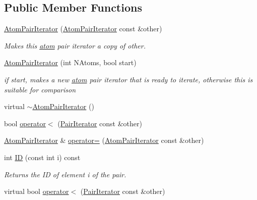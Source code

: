 \subsection*{Public Member Functions}
\begin{DoxyCompactItemize}
\item 
\hyperlink{classJKBuilder_1_1AtomPairIterator_a696744d82a9bb3feee21a96f450a510b}{AtomPairIterator} (\hyperlink{classJKBuilder_1_1AtomPairIterator}{AtomPairIterator} const \&other)
\begin{DoxyCompactList}\small\item\em Makes this \hyperlink{classJKBuilder_1_1atom}{atom} pair iterator a copy of other. \item\end{DoxyCompactList}\item 
\hyperlink{classJKBuilder_1_1AtomPairIterator_ad5df59ed812804b6371f17eabeb7d261}{AtomPairIterator} (int NAtoms, bool start)
\begin{DoxyCompactList}\small\item\em if start, makes a new \hyperlink{classJKBuilder_1_1atom}{atom} pair iterator that is ready to iterate, otherwise this is suitable for comparison \item\end{DoxyCompactList}\item 
virtual \hyperlink{classJKBuilder_1_1AtomPairIterator_aa26e88e305008d272c920bf0b959e96b}{$\sim$AtomPairIterator} ()
\item 
bool \hyperlink{classJKBuilder_1_1AtomPairIterator_a1984297ca1081efc0513ec2f5e6a6177}{operator$<$} (\hyperlink{classJKBuilder_1_1PairIterator}{PairIterator} const \&other)
\item 
\hyperlink{classJKBuilder_1_1AtomPairIterator}{AtomPairIterator} \& \hyperlink{classJKBuilder_1_1AtomPairIterator_aefda578091b26523e72740cec884aa45}{operator=} (\hyperlink{classJKBuilder_1_1AtomPairIterator}{AtomPairIterator} const \&other)
\item 
int \hyperlink{classJKBuilder_1_1PairIterator_a370ad37c854fbbf6421ebf9ab35cd027}{ID} (const int i) const 
\begin{DoxyCompactList}\small\item\em Returns the ID of element i of the pair. \item\end{DoxyCompactList}\item 
virtual bool \hyperlink{classJKBuilder_1_1PairIterator_a1984297ca1081efc0513ec2f5e6a6177}{operator$<$} (\hyperlink{classJKBuilder_1_1PairIterator}{PairIterator} const \&other)

\end{DoxyCompactItemize}
